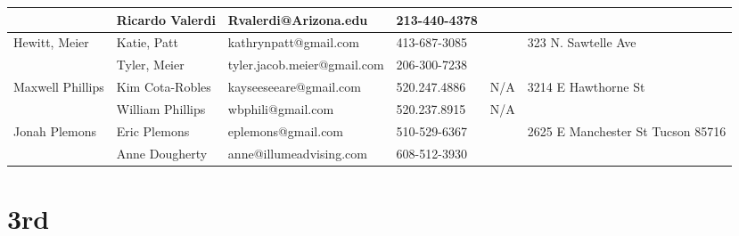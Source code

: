 \documentclass[landscape]{article}\usepackage[]{graphicx}\usepackage[]{color}
\begin{document}
\begin{longtable}{p{70pt}|p{75pt}|p{120pt}|p{60pt}|p{60pt}|p{120pt}|}
 & Ricardo Valerdi & Rvalerdi@Arizona.edu & 213-440-4378 &  & \\
\hline
\multirow{2}{70pt}{Hewitt, Meier} & Katie, Patt & kathrynpatt@gmail.com & 413-687-3085 &  & \multirow{2}{100pt}{323 N. Sawtelle Ave} \\
 & Tyler, Meier & tyler.jacob.meier@gmail.com & 206-300-7238 &  & \\
\hline
\multirow{2}{70pt}{Maxwell Phillips} & Kim Cota-Robles & kayseeseeare@gmail.com & 520.247.4886 & N/A & \multirow{2}{100pt}{3214 E Hawthorne St} \\
 & William Phillips & wbphili@gmail.com & 520.237.8915 & N/A & \\
\hline
\multirow{2}{70pt}{Jonah Plemons} & Eric Plemons & eplemons@gmail.com & 510-529-6367 &  & \multirow{2}{100pt}{2625 E Manchester St Tucson 85716} \\
 & Anne Dougherty & anne@illumeadvising.com & 608-512-3930 &  & \\
\hline
\end{longtable}
\newpage
\section{3rd}
\end{document}
